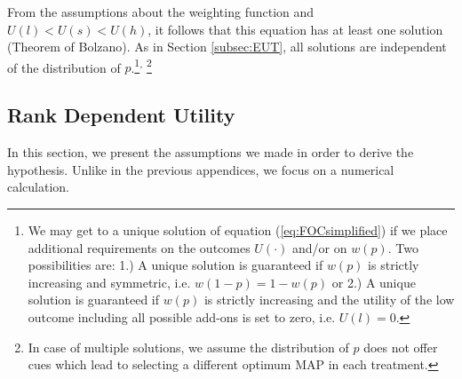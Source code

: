From the assumptions about the weighting function and $U(l)<U(s)<U(h)$, it follows that this equation has at least one solution (Theorem of Bolzano).
As in Section \ref{subsec:EUT}, all solutions are independent of the distribution of $p$.\footnote{
We may get to a unique solution of equation (\ref{eq:FOCsimplified}) if we place additional requirements on the outcomes $U(\cdot)$ and/or on $w(p)$.
Two possibilities are:
1.) A unique solution is guaranteed if $w(p)$ is strictly increasing and symmetric, i.e. $w(1-p) = 1-w(p)$ or
2.) A unique solution is guaranteed if $w(p)$ is strictly increasing and the utility of the low outcome including all possible add-ons is set to zero, i.e. $U(l) = 0$.
}\textsuperscript{,} 
\footnote{
In case of multiple solutions, we assume the distribution of $p$ does not offer cues which lead to selecting a different optimum MAP in each treatment.
}
	


\subsection{Rank Dependent Utility}
\label{subsec:RDU}
In this section, we present the assumptions we made in order to derive the hypothesis.
Unlike in the previous appendices, we focus on a numerical calculation.

